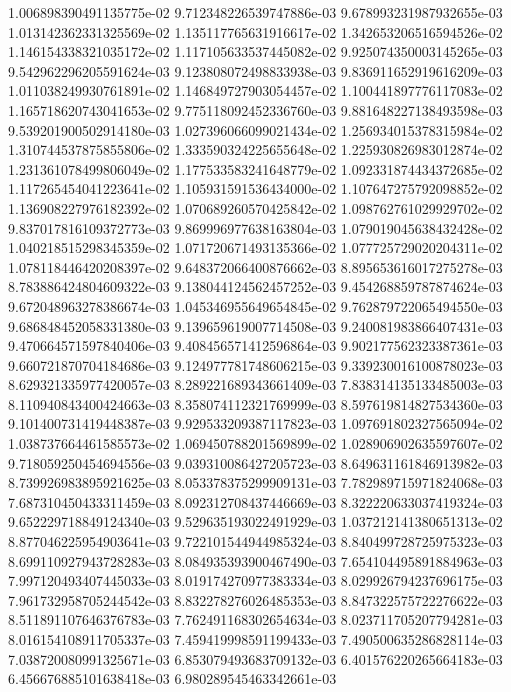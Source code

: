 1.006898390491135775e-02
9.712348226539747886e-03
9.678993231987932655e-03
1.013142362331325569e-02
1.135117765631916617e-02
1.342653206516594526e-02
1.146154338321035172e-02
1.117105633537445082e-02
9.925074350003145265e-03
9.542962296205591624e-03
9.123808072498833938e-03
9.836911652919616209e-03
1.011038249930761891e-02
1.146849727903054457e-02
1.100441897776117083e-02
1.165718620743041653e-02
9.775118092452336760e-03
9.881648227138493598e-03
9.539201900502914180e-03
1.027396066099021434e-02
1.256934015378315984e-02
1.310744537875855806e-02
1.333590324225655648e-02
1.225930826983012874e-02
1.231361078499806049e-02
1.177533583241648779e-02
1.092331874434372685e-02
1.117265454041223641e-02
1.105931591536434000e-02
1.107647275792098852e-02
1.136908227976182392e-02
1.070689260570425842e-02
1.098762761029929702e-02
9.837017816109372773e-03
9.869996977638163804e-03
1.079019045638432428e-02
1.040218515298345359e-02
1.071720671493135366e-02
1.077725729020204311e-02
1.078118446420208397e-02
9.648372066400876662e-03
8.895653616017275278e-03
8.783886424804609322e-03
9.138044124562457252e-03
9.454268859787874624e-03
9.672048963278386674e-03
1.045346955649654845e-02
9.762879722065494550e-03
9.686848452058331380e-03
9.139659619007714508e-03
9.240081983866407431e-03
9.470664571597840406e-03
9.408456571412596864e-03
9.902177562323387361e-03
9.660721870704184686e-03
9.124977781748606215e-03
9.339230016100878023e-03
8.629321335977420057e-03
8.289221689343661409e-03
7.838314135133485003e-03
8.110940843400424663e-03
8.358074112321769999e-03
8.597619814827534360e-03
9.101400731419448387e-03
9.929533209387117823e-03
1.097691802327565094e-02
1.038737664461585573e-02
1.069450788201569899e-02
1.028906902635597607e-02
9.718059250454694556e-03
9.039310086427205723e-03
8.649631161846913982e-03
8.739926983895921625e-03
8.053378375299909131e-03
7.782989715971824068e-03
7.687310450433311459e-03
8.092312708437446669e-03
8.322220633037419324e-03
9.652229718849124340e-03
9.529635193022491929e-03
1.037212141380651313e-02
8.877046225954903641e-03
9.722101544944985324e-03
8.840499728725975323e-03
8.699110927943728283e-03
8.084935393900467490e-03
7.654104495891884963e-03
7.997120493407445033e-03
8.019174270977383334e-03
8.029926794237696175e-03
7.961732958705244542e-03
8.832278276026485353e-03
8.847322575722276622e-03
8.511891107646376783e-03
7.762491168302654634e-03
8.023711705207794281e-03
8.016154108911705337e-03
7.459419998591199433e-03
7.490500635286828114e-03
7.038720080991325671e-03
6.853079493683709132e-03
6.401576220265664183e-03
6.456676885101638418e-03
6.980289545463342661e-03
